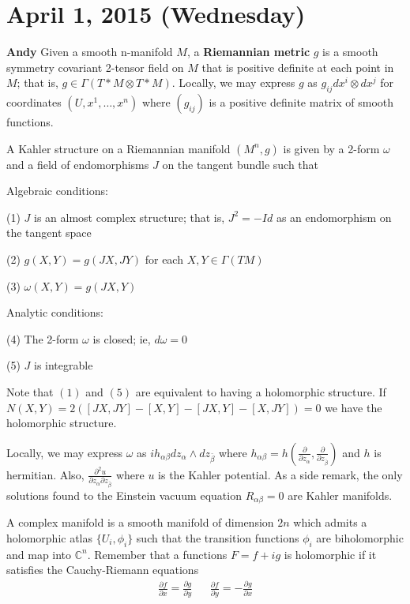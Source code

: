 \documentclass{article}
\begin{document}
\section{April 1, 2015 (Wednesday)}

\textbf{Andy} Given a smooth n-manifold $M$, a \textbf{Riemannian metric} $g$ is a smooth symmetry covariant 2-tensor field on $M$ that is positive definite at each point in $M$; that is, $g \in \Gamma(T*M \otimes T*M)$. Locally, we may express $g$ as $g_{ij}dx^i \otimes dx^j$ for coordinates $(U, x^1, \ldots, x^n)$ where $(g_{ij})$ is a positive definite matrix of smooth functions.

A Kahler structure on a Riemannian manifold $(M^n, g)$ is given by a 2-form $\omega$ and a field of endomorphisms $J$ on the tangent bundle such that

Algebraic conditions:

(1) $J$ is an almost complex structure; that is, $J^2 = -Id$ as an endomorphism on the tangent space

(2) $g(X,Y) = g(JX, JY)$ for each $X,Y \in \Gamma(TM)$

(3) $\omega(X,Y)= g(JX,Y)$

Analytic conditions:

(4) The 2-form $\omega$ is closed; ie, $d\omega = 0$

(5) $J$ is integrable

Note that $(1)$ and $(5)$ are equivalent to having a holomorphic structure. If $N(X,Y) = 2([JX, JY] - [X,Y] - [JX, Y] - [X,JY]) = 0$ we have the holomorphic structure.

Locally, we may express $\omega$ as $ih_{\alpha \beta}dz_\alpha \wedge dz_{\bar{\beta}}$ where $h_{\alpha \beta} = h(\frac{\partial}{\partial z_{\alpha}}, \frac{\partial}{\partial z_{\bar{\beta}}})$ and $h$ is hermitian. Also, $\frac{\partial^2 u}{\partial z_\alpha \partial z_{\bar{\beta}}}$ where $u$ is the Kahler potential. As a side remark, the only solutions found to the Einstein vacuum equation $R_{\alpha \beta} = 0$ are Kahler manifolds.

A complex manifold is a smooth manifold of dimension $2n$ which admits a holomorphic atlas $\{U_i, \phi_i \}$ such that the transition functions $\phi_i$ are biholomorphic and map into $\mathbb{C}^n$. Remember that a functions $F = f + ig$ is holomorphic if it satisfies the Cauchy-Riemann equations
\begin{align*}
\frac{\partial f}{\partial x} = \frac{\partial g}{\partial y} && \frac{\partial f}{\partial y} = -\frac{\partial g}{\partial x}
\end{align*}
\end{document}
